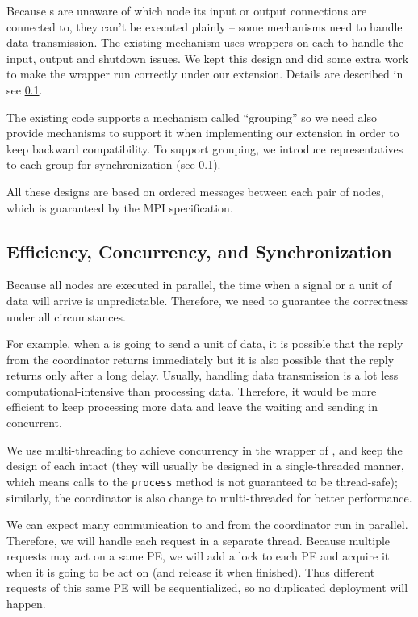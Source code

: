 Because \tPEInst{}s are unaware of which node its input or output connections are connected to, they can't be executed plainly -- some mechanisms need to handle data transmission. The existing \dpy mechanism uses wrappers on each \tPEInst to handle the input, output and shutdown issues. We kept this design and did some extra work to make the wrapper run correctly under our extension. Details are described in see \ref{ssec:incdep_ecs}.

The existing \Dpy code supports a mechanism called ``grouping'' so we need also provide mechanisms to support it when implementing our extension in order to keep backward compatibility. To support grouping, we introduce representatives to each group for synchronization (see \ref{ssec:incdep_ecs}).

All these designs are based on ordered messages between each pair of nodes, which is guaranteed by the MPI specification.

\subsection{Efficiency, Concurrency, and Synchronization} \label{ssec:incdep_ecs}
Because all nodes are executed in parallel, the time when a signal or a unit of data will arrive is unpredictable. Therefore, we need to guarantee the correctness under all circumstances. 

For example, when a \tPEInst is going to send a unit of data, it is possible that the reply from the coordinator returns immediately but it is also possible that the reply returns only after a long delay. Usually, handling data transmission is a lot less computational-intensive than processing data. Therefore, it would be more efficient to keep processing more data and leave the waiting and sending in concurrent.

We use multi-threading to achieve concurrency in the wrapper of \tPEInst, and keep the design of each \tPEInst intact (they will usually be designed in a single-threaded manner, which means calls to the \lstinline|process| method is not guaranteed to be thread-safe); similarly, the coordinator is also change to multi-threaded for better performance.

We can expect many communication to and from the coordinator run in parallel. Therefore, we will handle each request in a separate thread. Because multiple requests may act on a same PE, we will add a lock to each PE and acquire it when it is going to be act on (and release it when finished). Thus different requests of this same PE will be sequentialized, so no duplicated deployment will happen.

